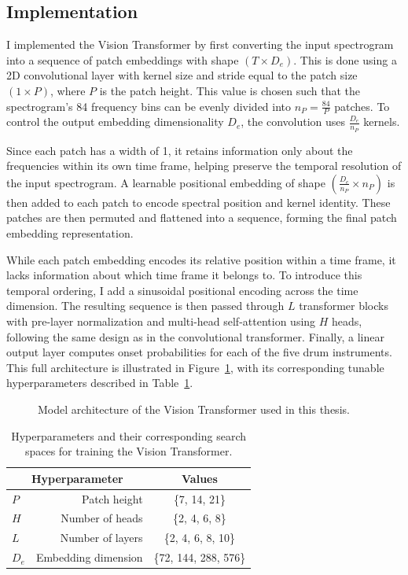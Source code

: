 \subsection{Implementation}

I implemented the Vision Transformer by first converting the input spectrogram into a sequence of patch embeddings with shape $(T \times D_e)$. This is done using a 2D convolutional layer with kernel size and stride equal to the patch size $(1 \times P)$, where $P$ is the patch height. This value is chosen such that the spectrogram's 84 frequency bins can be evenly divided into $n_P = \frac{84}{P}$ patches. To control the output embedding dimensionality $D_e$, the convolution uses $\frac{D_e}{n_P}$ kernels.

Since each patch has a width of 1, it retains information only about the frequencies within its own time frame, helping preserve the temporal resolution of the input spectrogram. A learnable positional embedding of shape $(\frac{D_e}{n_P} \times n_P)$ is then added to each patch to encode spectral position and kernel identity. These patches are then permuted and flattened into a sequence, forming the final patch embedding representation.

While each patch embedding encodes its relative position within a time frame, it lacks information about which time frame it belongs to. To introduce this temporal ordering, I add a sinusoidal positional encoding across the time dimension. The resulting sequence is then passed through $L$ transformer blocks with pre-layer normalization and multi-head self-attention using $H$ heads, following the same design as in the convolutional transformer. Finally, a linear output layer computes onset probabilities for each of the five drum instruments. This full architecture is illustrated in Figure~\ref{ViTFigure}, with its corresponding tunable hyperparameters described in Table~\ref{ViTHyperparams}.

\begin{figure}[H]
    \hspace*{-0.5cm}
    \centering
    
    \caption{Model architecture of the Vision Transformer used in this thesis.}
    \label{ViTFigure}
\end{figure}

\begin{table}[H]
    \centering
    \begin{tabular}{lr|c}
        \multicolumn{2}{c|}{Hyperparameter} & Values       \\
        \hline
        $P$ & Patch height      & \{7, 14, 21\} \\
        $H$ & Number of heads     & \{2, 4, 6, 8\} \\
        $L$ & Number of layers      & \{2, 4, 6, 8, 10\} \\
        $D_e$ & Embedding dimension      & \{72, 144, 288, 576\} \\
    \end{tabular}
    \caption{Hyperparameters and their corresponding search spaces for training the Vision Transformer.}
    \label{ViTHyperparams}
\end{table}